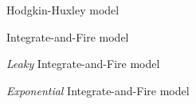%
%

\begin{description}[CABR]

\item[HH]{Hodgkin-Huxley model}
\item[IF]{Integrate-and-Fire model}
\item[LIF]{\textit{Leaky} Integrate-and-Fire model}
\item[eIF]{\textit{Exponential} Integrate-and-Fire model}

\end{description}